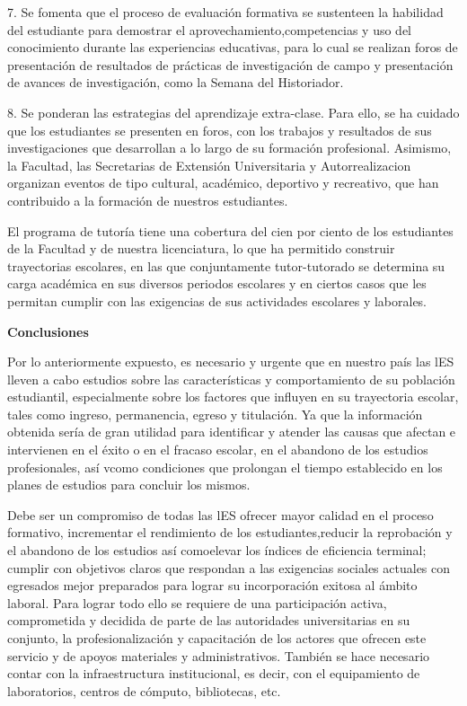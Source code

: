 \begin{Obs}
\item[7.] Se fomenta que el proceso de evaluación formativa se sustente\linebreak en la habilidad del estudiante para demostrar el aprovechamiento,\linebreak competencias y uso del conocimiento durante las experiencias educativas, para lo cual se realizan foros de presentación de resultados de prácticas de investigación de campo y presentación de avances de investigación, como la Semana del Historiador.
\item[8.] Se ponderan las estrategias del aprendizaje  extra-clase. Para ello, se ha cuidado que los estudiantes se  presenten en foros, con  los trabajos y resultados de sus  investigaciones que desarrollan a lo largo de su formación profesional. Asimismo, la Facultad, las Secretarias de Extensión Universitaria y Autorrealizacion organizan eventos de tipo cultural, académico, deportivo y recreativo, que han contribuido a la formación de nuestros estudiantes.
\end{Obs}

El programa de tutoría tiene una cobertura del cien por ciento de los estudiantes de la Facultad y de nuestra licenciatura, lo que ha permitido construir trayectorias escolares, en las que conjuntamente tutor-tutorado se determina su carga académica en sus diversos periodos escolares  y en ciertos casos que les permitan cumplir con las exigencias de sus actividades escolares y laborales.

\medskip
\textbf{Conclusiones}

\enlargethispage{1\baselineskip}
Por lo anteriormente expuesto, es necesario  y urgente que en nuestro país las  lES  lleven  a cabo  estudios  sobre  las  características  y comportamiento de su población estudiantil, especialmente sobre los factores que influyen en su trayectoria escolar, tales como ingreso, permanencia, egreso y titulación. Ya que la información obtenida sería de gran utilidad para  identificar y atender las causas que afectan e intervienen en el éxito o en el fracaso escolar, en el abandono de los estudios profesionales, así vcomo condiciones que prolongan el tiempo establecido en los planes de estudios para concluir los mismos.

Debe ser un compromiso de todas las lES ofrecer mayor calidad en el proceso formativo, incrementar el rendimiento de los estudiantes,\linebreak reducir la reprobación y el abandono de los estudios así 
como\linebreak elevar los índices de eficiencia terminal; cumplir con objetivos claros que respondan a las exigencias sociales actuales con egresados mejor preparados para lograr su incorporación exitosa al ámbito laboral. Para lograr todo ello se requiere de una participación activa, comprometida y decidida de parte de las autoridades universitarias en su conjunto, la profesionalización y capacitación de los actores que ofrecen este servicio y de apoyos materiales y administrativos. También se hace necesario contar con la infraestructura institucional, es decir, con el equipamiento de laboratorios, centros de cómputo, bibliotecas, etc\@.

